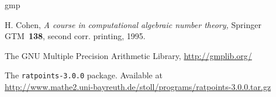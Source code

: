 \documentclass[12pt,a4paper,oneside]{amsart}
\newcommand{\rpversion}{3.0.0} %
\begin{document}
\begin{thebibliography}{gmp}
\frenchspacing

  H. Cohen, \textit{A course in computational algebraic number theory,}
  Springer GTM~\textbf{138}, second corr. printing, 1995.

  The GNU Multiple Precision Arithmetic Library, \url{http://gmplib.org/}

  The \texttt{ratpoints-\rpversion} package. Available at \\
  \url{http://www.mathe2.uni-bayreuth.de/stoll/programs/ratpoints-\rpversion.tar.gz}

\end{thebibliography}
\end{document}
